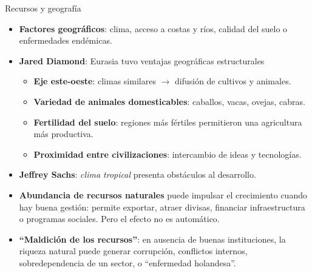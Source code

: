 \documentclass{beamer}
\begin{document}
\begin{frame}{Recursos y geografía}
    \small
    \begin{itemize}
        \item \textbf{Factores geográficos}: clima, acceso a costas y ríos, calidad del suelo o enfermedades endémicas.
        
        \item \textbf{Jared Diamond}: Eurasia tuvo ventajas geográficas estructurales
        \begin{itemize}
            \item \textbf{Eje este-oeste}: climas similares $\rightarrow$ difusión de cultivos y animales.
            \item \textbf{Variedad de animales domesticables}: caballos, vacas, ovejas, cabras.
            \item \textbf{Fertilidad del suelo}: regiones más fértiles permitieron una agricultura más productiva.
            \item \textbf{Proximidad entre civilizaciones}: intercambio de ideas y tecnologías.
        \end{itemize}

        \item \textbf{Jeffrey Sachs}: \textit{clima tropical} presenta obstáculos al desarrollo.

        \item \textbf{Abundancia de recursos naturales} puede impulsar el crecimiento cuando hay buena gestión: permite exportar, atraer divisas, financiar infraestructura o programas sociales. Pero el efecto no es automático.

        \item \textbf{“Maldición de los recursos”}: en ausencia de buenas instituciones, la riqueza natural puede generar corrupción, conflictos internos, sobredependencia de un sector, o “enfermedad holandesa”.
    \end{itemize}
\end{frame}
\end{document}
